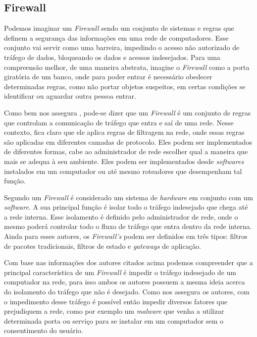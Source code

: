 \subsection{Firewall}
Podemos imaginar um \textit{Firewall} sendo um conjunto de sistemas e regras que definem a segurança das informações em uma rede de computadores. Esse conjunto vai servir como uma barreira, impedindo o acesso não autorizado de tráfego de dados, bloqueando os dados e acessos indesejados. Para uma compreensão melhor, de uma maneira abstrata, imagine o \textit{Firewall} como a porta giratória de um banco, onde para poder entrar é necessário obedecer determinadas regras, como não portar objetos suspeitos, em certas condições se identificar ou aguardar outra pessoa entrar.

Como bem nos assegura , pode-se dizer que um \textit{Firewall} é um conjunto de regras que controlam a comunicação de tráfego que entra e saí de uma rede. Nesse contexto, fica claro que ele aplica regras de filtragem na rede, onde essas regras são aplicadas em diferentes camadas de protocolo. Eles podem ser implementados de diferentes formas, cabe ao administrador de rede escolher qual a maneira que mais se adequa à seu ambiente. Eles podem ser implementados desde \textit{softwares} instalados em um computador ou até mesmo roteadores que desempenham tal função.

Segundo  um \textit{Firewall} é considerado um sistema de \textit{hardware} em conjunto com um \textit{software}. A sua principal função é isolar todo o tráfego indesejado que chega até a rede interna. Esse isolamento é definido pelo administrador de rede, onde o mesmo poderá controlar todo o fluxo de tráfego que entra dentro da rede interna. Ainda para esses autores, os \textit{Firewall's} podem ser definidos em três tipos: filtros de pacotes tradicionais, filtros de estado e \textit{gateways} de aplicação.

Com base nas informações dos autores citados acima podemos compreender que a principal característica de um \textit{Firewall} é impedir o tráfego indesejado de um computador na rede, para isso ambos os autores possuem a mesma ideia acerca do isolamento do tráfego que não é desejado. Como nos assegura os autores, com o impedimento desse tráfego é possível então impedir diversos fatores que prejudiquem a rede, como por exemplo um \textit{malware} que venha a utilizar determinada porta ou serviço para se instalar em um computador sem o consentimento do usuário.

